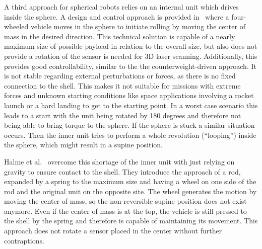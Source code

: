 A third approach for spherical robots relies on an internal unit which drives inside the sphere.
A design and control approach is provided in~\cite{soa6} where a four-wheeled vehicle moves in the sphere to initiate rolling by moving the center of mass in the desired direction.
This technical solution is capable of a nearly maximum size of possible payload in relation to the overall-size, but also does not provide a rotation of the sensor is needed for 3D laser scanning.
Additionally, this provides good controllability, similar to the the counterweight-driven approach.
It is not stable regarding external perturbations or forces, as there is no fixed connection to the shell.
This makes it not suitable for missions with extreme forces and unknown starting conditions like space applications involving a rocket launch or a hard landing to get to the starting point.
In a worst case scenario this leads to a start with the unit being rotated by 180 degrees and therefore not being able to bring torque to the sphere.
If the sphere is stuck a similar situation occurs.
Then the inner unit tries to perform a whole revolution (``looping'') inside the sphere, which might result in a supine position.

Halme et al.~\cite{soa7} overcome this shortage of the inner unit with just relying on gravity to ensure contact to the shell.
They introduce the approach of a rod, expanded by a spring to the maximum size and having a wheel on one side of the rod and the original unit on the opposite site.
The wheel generates the motion by moving the center of mass, so the non-reversible supine position does not exist anymore.
Even if the center of mass is at the top, the vehicle is still pressed to the shell by the spring and therefore is capable of maintaining its movement.
This approach does not rotate a sensor placed in the center without further contraptions.

